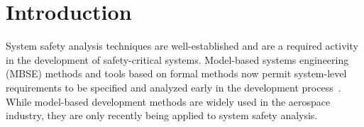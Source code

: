 \section{Introduction}
\label{sec:intro}


System safety analysis techniques are well-established and are a required activity in the development of safety-critical systems. Model-based systems engineering (MBSE) methods and tools based on formal methods now permit system-level requirements to be specified and analyzed early in the development process~\cite{NFM2012:CoGaMiWhLaLu,CAV2015:BoCiGrMa}. While model-based development methods are widely used in the aerospace industry, they are only recently being applied to system safety analysis.  


